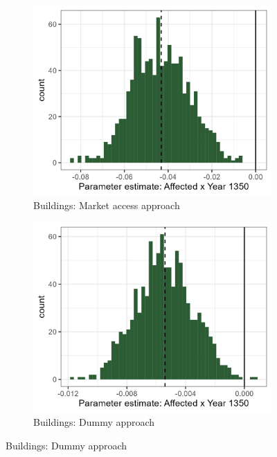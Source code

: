 \begin{figure}[h!]
\begin{subfigure}[b]{0.45\textwidth}
    \end{subfigure}
    \vspace{0.45cm}
    \begin{subfigure}[b]{0.45\textwidth}
        \centering
        \caption{\label{fig:distri_c} Buildings: Market access approach}
        \includegraphics[width=\textwidth]{Plots/Regression_plots/arch_MA_buildings_boot_norm.png}
    \end{subfigure}
    \hfill
    \begin{subfigure}[b]{0.45\textwidth}
        \centering
        \caption{\label{fig:distri_d} Buildings: Dummy approach}
        \includegraphics[width=\textwidth]{Plots/Regression_plots/arch_dummy_buildings_boot_norm.png}
    \end{subfigure}
    \label{fig:arch_reg_boot1}
\end{figure}


